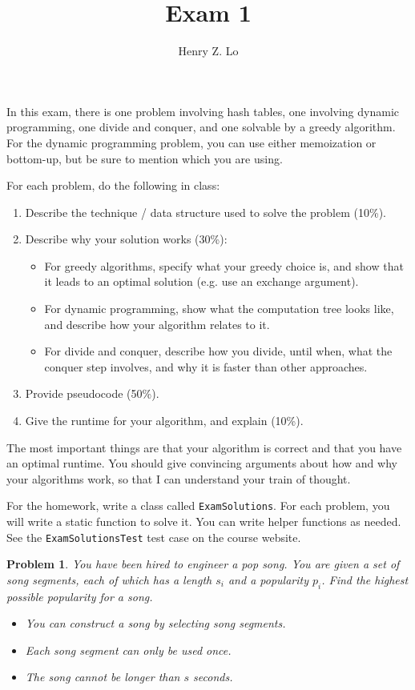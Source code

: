 \documentclass{article}
\newtheorem{problem}{Problem}
\begin{document}
\title{Exam 1}
\author{Henry Z. Lo}
\maketitle

In this exam, there is one problem involving hash tables, one involving dynamic programming, one divide and conquer, and one solvable by a greedy algorithm.  For the dynamic programming problem, you can use either memoization or bottom-up, but be sure to mention which you are using.

For each problem, do the following in class:
\begin{enumerate}
\item Describe the technique / data structure used to solve the problem (10\%).
\item Describe why your solution works (30\%):
\begin{itemize}
\item For greedy algorithms, specify what your greedy choice is, and show that it leads to an optimal solution (e.g. use an exchange argument).
\item For dynamic programming, show what the computation tree looks like, and describe how your algorithm relates to it.
\item For divide and conquer, describe how you divide, until when, what the conquer step involves, and why it is faster than other approaches.
\end{itemize}
\item Provide pseudocode (50\%).
\item Give the runtime for your algorithm, and explain (10\%).
\end{enumerate}

The most important things are that your algorithm is correct and that you have an optimal runtime.  You should give convincing arguments about how and why your algorithms work, so that I can understand your train of thought.

For the homework, write a class called \texttt{ExamSolutions}.  For each problem, you will write a static function to solve it.  You can write helper functions as needed.  See the \texttt{ExamSolutionsTest} test case on the course website.

\pagebreak

\begin{problem}
You have been hired to engineer a pop song.  You are given a set of song segments, each of which has a length $s_i$ and a popularity $p_i$.  Find the highest possible popularity for a song.
\begin{itemize}
\item You can construct a song by selecting song segments.
\item Each song segment can only be used once.
\item The song cannot be longer than $s$ seconds.
\end{itemize}
\end{problem}
\end{document}
